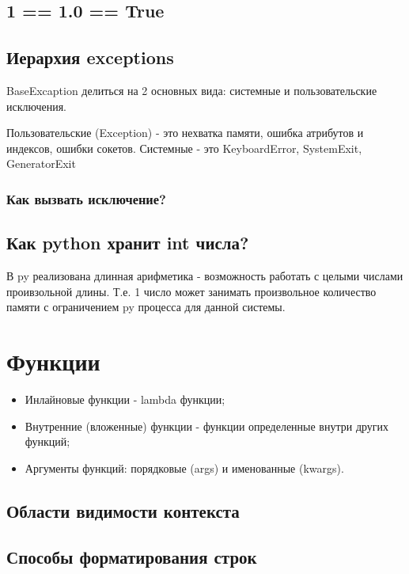 \subsection{1 == 1.0 == True}

\subsection{Иерархия exceptions}

BaseExcaption делиться на 2 основных вида: системные и пользовательские исключения.

Пользовательские (Exception) - это нехватка памяти, ошибка атрибутов и индексов, ошибки сокетов.
Системные - это KeyboardError, SystemExit, GeneratorExit

\subsubsection{Как вызвать исключение?}


\subsection{Как python хранит int числа?}

В py реализована длинная арифметика - возможность работать с целыми числами проивзольной длины. Т.е. 1 число может занимать произвольное количество памяти с ограничением py процесса для данной системы.

\section{Функции}

\begin{itemize}
    \item Инлайновые функции - lambda функции;
    \item Внутренние (вложенные) функции - функции определенные внутри других функций;
    \item Аргументы функций: порядковые (args) и именованные (kwargs).
\end{itemize}

\subsection{Области видимости контекста}

\subsection{Способы форматирования строк}

